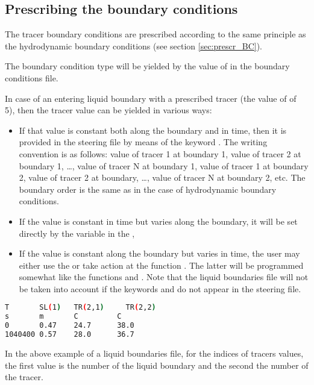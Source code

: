 \subsection{Prescribing the boundary conditions}

The tracer boundary conditions are prescribed according to the same principle
as the hydrodynamic boundary conditions (see section \ref{sec:prescr_BC}).

The boundary condition type will be yielded by the value of  in
the boundary conditions file.

In case of an entering liquid boundary with a prescribed tracer (the value of
 of 5), then the tracer value can be yielded in various ways:

\begin{itemize}
\item  If that value is constant both along the boundary and in time, then it
is provided in the steering file by means of the keyword . The writing convention is as follows: value of tracer 1 at
boundary 1, value of tracer 2 at boundary 1, \dots , value of tracer N at
boundary 1, value of tracer 1 at boundary 2, value of tracer 2 at boundary,
\dots , value of tracer N at boundary 2, etc. The boundary order is the same as
in the case of hydrodynamic boundary conditions.

\item  If the value is constant in time but varies along the boundary, it will
be set directly by the  variable in the
,

\item  If the value is constant along the boundary but varies in time, the user
may either use the  or take action at the
function . The latter will be programmed somewhat like the functions
 and .
Note that the liquid boundaries file will not be taken into account
if the keywords  and  do not appear in the steering file.
\end{itemize}

\begin{lstlisting}[language=bash]
T       SL(1)   TR(2,1)     TR(2,2)
s       m       C         C
0       0.47    24.7      38.0
1040400 0.57    28.0      36.7
\end{lstlisting}

In the above example of a liquid boundaries file, for the indices of tracers
values, the first value is the number of the liquid boundary and the second the
number of the tracer.

